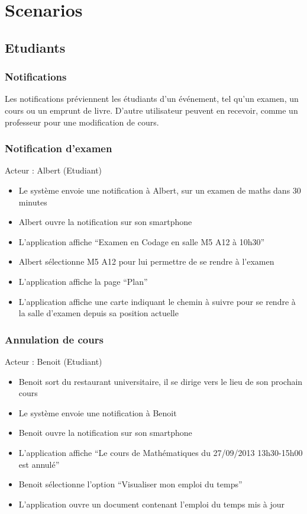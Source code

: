 \chapter{Scenarios}

\section{Etudiants}

\subsection{Notifications}

Les notifications préviennent les étudiants d'un événement, tel qu'un examen, un cours ou un emprunt de livre. D'autre utilisateur peuvent en recevoir, comme un professeur pour une modification de cours.

\subsection*{Notification d’examen}
Acteur : Albert (Etudiant)
\begin{itemize}
\item Le système envoie une notification à Albert, sur un examen de maths dans 30 minutes 
\item Albert ouvre la notification sur son smartphone 
\item L’application affiche “Examen en Codage en salle M5 A12 à 10h30”  
\item Albert sélectionne M5 A12 pour lui permettre de se rendre à l’examen 
\item L’application affiche la page “Plan” 
\item L’application affiche une carte indiquant le chemin à suivre pour se rendre à la salle d’examen depuis sa position actuelle 
\end{itemize}

\subsection*{Annulation de cours}
Acteur : Benoit (Etudiant)
\begin{itemize}
\item Benoit sort du restaurant universitaire, il se dirige vers le lieu de son prochain cours  
\item Le système envoie une notification à Benoit 
\item Benoit ouvre la notification sur son smartphone 
\item L’application affiche “Le cours de Mathématiques du 27/09/2013 13h30-15h00 est annulé”  
\item Benoit sélectionne l’option “Visualiser mon  emploi du temps”  
\item L’application ouvre un document contenant l’emploi du temps mis à jour 
\end{itemize}

